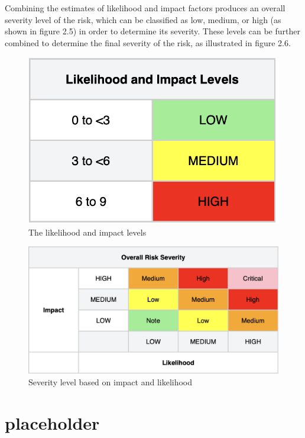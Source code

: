 Combining the estimates of likelihood and impact factors produces an overall severity level of the risk, which can be classified as low, medium, or high (as shown in figure 2.5) in order to determine its severity. These levels can be further combined to determine the final severity of the risk, as illustrated in figure 2.6. 

\begin{figure}[htp]
    \centering
    \includegraphics[scale=0.5]{Images/OWASP-likelihood.png}
    \caption{The likelihood and impact levels}
    \label{fig:my_label}
\end{figure}

\begin{figure}[htp]
    \centering
    \includegraphics[scale=0.4]{Images/OWASP-severity.png}
    \caption{Severity level based on impact and likelihood}
    \label{fig:my_label}
\end{figure}
\section{placeholder}








